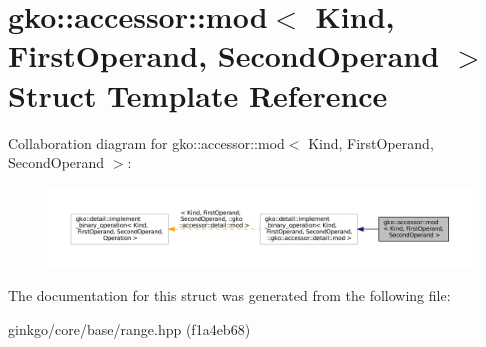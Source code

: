 \hypertarget{structgko_1_1accessor_1_1mod}{}\section{gko\+:\+:accessor\+:\+:mod$<$ Kind, First\+Operand, Second\+Operand $>$ Struct Template Reference}
\label{structgko_1_1accessor_1_1mod}


Collaboration diagram for gko\+:\+:accessor\+:\+:mod$<$ Kind, First\+Operand, Second\+Operand $>$\+:
\nopagebreak
\begin{figure}[H]
\begin{center}
\leavevmode
\includegraphics[width=350pt]{structgko_1_1accessor_1_1mod__coll__graph}
\end{center}
\end{figure}


The documentation for this struct was generated from the following file\+:\begin{DoxyCompactItemize}
\item 
ginkgo/core/base/range.\+hpp (f1a4eb68)\end{DoxyCompactItemize}
